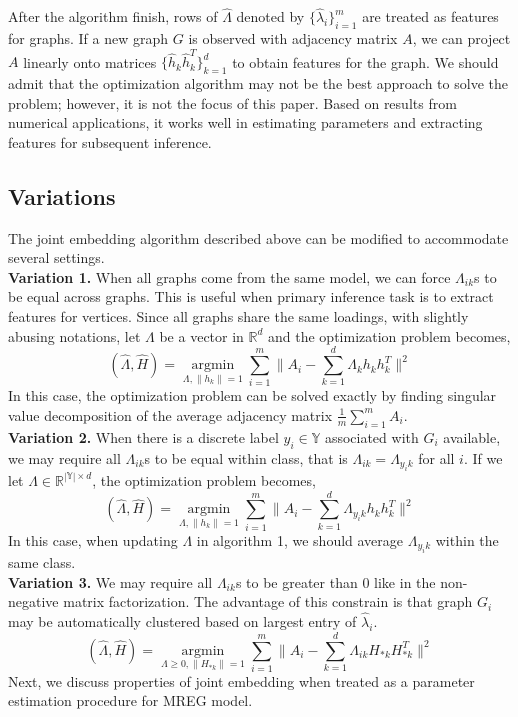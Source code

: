 \documentclass[10pt,journal,compsoc]{IEEEtran}
\begin{document}
\noindent After the algorithm finish, rows of $\hat{\Lambda}$ denoted by $\{\hat{\lambda}_i\}_{i=1}^m$ are treated as features for graphs. If a new graph $G$ is observed with adjacency matrix $A$, we can project $A$ linearly onto matrices $\{\hat{h}_k \hat{h}_k^T\}_{k=1}^{d}$ to obtain features for the graph. We should admit that the optimization algorithm may not be the best approach to solve the problem; however, it is not the focus of this paper. Based on results from numerical applications, it works well in estimating parameters and extracting features for subsequent inference.



\subsection{Variations}
The joint embedding algorithm described above can be modified to accommodate several settings. \\
\textbf{Variation 1.} When all graphs come from the same model, we can force $\Lambda_{ik}$s to be equal across graphs. This is useful when primary inference task is to extract features for vertices. Since all graphs share the same loadings, with slightly abusing notations, let $\Lambda$ be a vector in $\mathbb{R}^d$ and the optimization problem becomes,
\[ (\hat{\Lambda},\hat{H}) = \underset{\Lambda,\|h_k\|=1}{\operatorname{argmin}} \sum\limits_{i=1}^{m} \| A_i- \sum\limits_{k=1}^{d} \Lambda_{k} h_k h_k^T \|  ^2  \] 
In this case, the optimization problem can be solved exactly by finding singular value decomposition of the average adjacency matrix $\frac{1}{m}\sum\limits_{i=1}^{m}A_i$. \\
\textbf{Variation 2.} When there is a discrete label $y_i \in \mathbb{Y}$ associated with $G_i$ available, we may require all $\Lambda_{ik}$s to be equal within class, that is $\Lambda_{ik}=\Lambda_{y_ik}$ for all $i$. If we let $\Lambda \in \mathbb{R}^{|\mathbb{Y}| \times d}$, the optimization problem becomes,
\[ (\hat{\Lambda},\hat{H}) = \underset{\Lambda,\|h_k\|=1}{\operatorname{argmin}} \sum\limits_{i=1}^{m} \| A_i- \sum\limits_{k=1}^{d} \Lambda_{y_i k} h_k h_k ^T \|  ^2  \] 
In this case, when updating $\Lambda$ in algorithm 1, we should average $\Lambda_{y_i k}$ within the same class. \\
\textbf{Variation 3.} We may require all $\Lambda_{ik}$s to be greater than $0$ like in the non-negative matrix factorization. The advantage of this constrain is that graph $G_i$ may be automatically clustered  based on largest entry of $\hat{\lambda}_{i}$. 
\[ (\hat{\Lambda},\hat{H}) = \underset{\Lambda \geq 0,\|H_{*k}\|=1}{\operatorname{argmin}} \sum\limits_{i=1}^{m} \| A_i- \sum\limits_{k=1}^{d} \Lambda_{ik} H_{*k} H_{*k}^T \|  ^2  \] 
Next, we discuss properties of joint embedding when treated as a parameter estimation procedure for MREG model.
\end{document}
